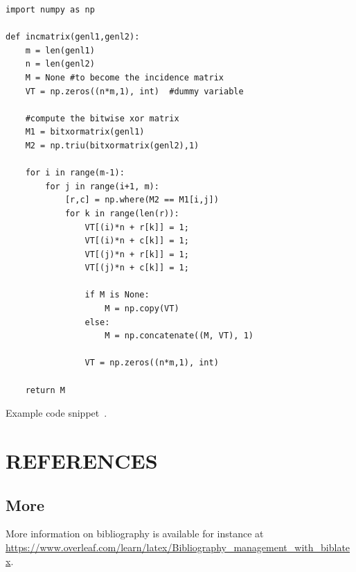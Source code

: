 \documentclass{reportOpenlab} %
\begin{document}
\begin{longlisting}
\begin{verbatim}
import numpy as np
    
def incmatrix(genl1,genl2):
    m = len(genl1)
    n = len(genl2)
    M = None #to become the incidence matrix
    VT = np.zeros((n*m,1), int)  #dummy variable
    
    #compute the bitwise xor matrix
    M1 = bitxormatrix(genl1)
    M2 = np.triu(bitxormatrix(genl2),1) 

    for i in range(m-1):
        for j in range(i+1, m):
            [r,c] = np.where(M2 == M1[i,j])
            for k in range(len(r)):
                VT[(i)*n + r[k]] = 1;
                VT[(i)*n + c[k]] = 1;
                VT[(j)*n + r[k]] = 1;
                VT[(j)*n + c[k]] = 1;
                
                if M is None:
                    M = np.copy(VT)
                else:
                    M = np.concatenate((M, VT), 1)
                
                VT = np.zeros((n*m,1), int)
    
    return M
\end{verbatim}
\caption{Example code snippet~\cite{code}.}
\label{code:example}
\end{longlisting}

\section{REFERENCES}
\printbibliography[heading=none]

\subsection{More}
More information on bibliography is available for instance at \url{https://www.overleaf.com/learn/latex/Bibliography_management_with_biblatex}.
\end{document}
